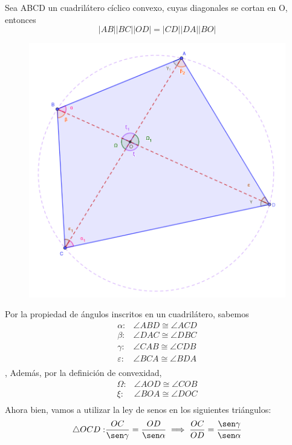 \begin{problema}
	 Sea ABCD un cuadrilátero cíclico convexo, cuyas diagonales se cortan en O, entonces
	$$
	|A B||B C||O D|=|C D||D A||B O|
	$$
		\begin{figure}[H]
		\centering 
		\includegraphics[scale=0.3]{Images/3}
	\end{figure}
	\begin{dem}
		Por la propiedad de ángulos inscritos en un cuadrilátero, sabemos 
		\begin{align*}
			\alpha : & \angle ABD \cong \angle ACD\\
			\beta : & \angle DAC \cong \angle DBC\\
			\gamma : & \angle CAB \cong \angle CDB\\
			\varepsilon : & \angle BCA \cong \angle BDA\\
		\end{align*},
	Además, por la definición de convexidad, 
	\begin{align*}
		\Omega : & \angle AOD \cong \angle COB\\
		\xi : & \angle BOA \cong \angle DOC\\
	\end{align*}
Ahora bien, vamos a utilizar la ley de senos en los siguientes triángulos: 
\begin{align*}
	\triangle OCD: & \frac{OC}{\sen \gamma}=\frac{OD}{\sen \alpha}\implies \frac{OC}{OD}=\frac{\sen \gamma}{\sen \alpha}\\

\end{align*}
\end{dem}
\end{problema}
